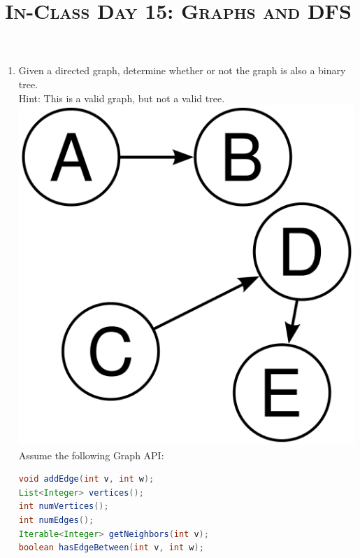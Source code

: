 \documentclass{article}
\title{\large{\textsc{In-Class Day 15: Graphs and DFS}}}
\date{}
\begin{document}
\maketitle

\subsection*{}


\begin{enumerate}


\item Given a directed graph, determine whether or not the graph is also a binary tree.\\
Hint:
This is a valid graph, but not a valid tree.\\
\includegraphics[width=\textwidth/5]{disjointGraph.png}
\\


Assume the following Graph API:

\begin{lstlisting}[language=Java]
void addEdge(int v, int w);
List<Integer> vertices();
int numVertices();
int numEdges();
Iterable<Integer> getNeighbors(int v);
boolean hasEdgeBetween(int v, int w);
\end{lstlisting}



\end{enumerate}
\end{document}
